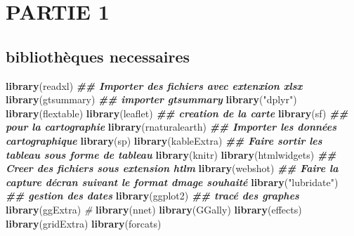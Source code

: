 \documentclass[
]{article}
\author{}
\date{\vspace{-2.5em}}
\newenvironment{Shaded}{\begin{snugshade}}{\end{snugshade}}
\newcommand{\CommentTok}[1]{\textcolor[rgb]{0.56,0.35,0.01}{\textit{#1}}}
\newcommand{\DocumentationTok}[1]{\textcolor[rgb]{0.56,0.35,0.01}{\textbf{\textit{#1}}}}
\newcommand{\FunctionTok}[1]{\textcolor[rgb]{0.13,0.29,0.53}{\textbf{#1}}}
\newcommand{\NormalTok}[1]{#1}
\newcommand{\StringTok}[1]{\textcolor[rgb]{0.31,0.60,0.02}{#1}}
\begin{document}
{
\setcounter{tocdepth}{6}
\tableofcontents
}

\newpage
\renewcommand{\contentsname}{\textcolor{blue}{Table des matières}}

\textcolor{blue}{\tableofcontents}

\hypertarget{partie-1}{%
\section{PARTIE 1}\label{partie-1}}

\hypertarget{bibliothuxe8ques-necessaires}{%
\subsection{bibliothèques
necessaires}\label{bibliothuxe8ques-necessaires}}

\begin{Shaded}
\begin{Highlighting}[]
\FunctionTok{library}\NormalTok{(readxl)   }\DocumentationTok{\#\# Importer des fichiers avec extenxion xlsx}
\FunctionTok{library}\NormalTok{(gtsummary) }\DocumentationTok{\#\# importer gtsummary}
\FunctionTok{library}\NormalTok{(}\StringTok{"dplyr"}\NormalTok{)}
\FunctionTok{library}\NormalTok{(flextable)}
\FunctionTok{library}\NormalTok{(leaflet) }\DocumentationTok{\#\# creation de la carte}
\FunctionTok{library}\NormalTok{(sf)       }\DocumentationTok{\#\# pour la cartographie}
\FunctionTok{library}\NormalTok{(rnaturalearth)  }\DocumentationTok{\#\# Importer les données cartographique}
\FunctionTok{library}\NormalTok{(sp)}
\FunctionTok{library}\NormalTok{(kableExtra)         }\DocumentationTok{\#\# Faire sortir les tableau sous forme de tableau}
\FunctionTok{library}\NormalTok{(knitr)}
\FunctionTok{library}\NormalTok{(htmlwidgets)        }\DocumentationTok{\#\# Creer des fichiers sous extension htlm}
\FunctionTok{library}\NormalTok{(webshot)            }\DocumentationTok{\#\# Faire la capture d\textquotesingle{}écran suivant le format d\textquotesingle{}mage souhaité}
\FunctionTok{library}\NormalTok{(}\StringTok{"lubridate"}\NormalTok{)       }\DocumentationTok{\#\# gestion des dates}
\FunctionTok{library}\NormalTok{(ggplot2)          }\DocumentationTok{\#\# tracé des graphes}
\FunctionTok{library}\NormalTok{(ggExtra)          }\CommentTok{\#}
\FunctionTok{library}\NormalTok{(nnet)}
\FunctionTok{library}\NormalTok{(GGally)}
\FunctionTok{library}\NormalTok{(effects) }
\FunctionTok{library}\NormalTok{(gridExtra)}
\FunctionTok{library}\NormalTok{(forcats)}
\end{Highlighting}
\end{Shaded}
\end{document}
